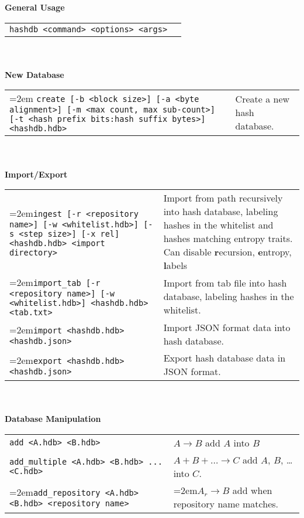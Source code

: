 \begin{footnotesize}
\textbf{General Usage} \\
\begin{tabular}{p{3.6 in} p{3.0 in}}
\texttt{hashdb <command> <options> <args>} & \\
\end{tabular}
\\
\\
\textbf{New Database} \\
\begin{tabular}{p{3.6 in} p{3.0 in}}
\hangindent=2em \texttt{create [-b <block size>] [-a <byte alignment>] [-m <max count, max sub-count>] [-t <hash prefix bits:hash suffix bytes>] <hashdb.hdb>} &
Create a new hash database.\\
\end{tabular}
\\
\\
\textbf{Import/Export} \\
\begin{tabular}{p{3.6 in} p{3.0 in}}
\hangindent=2em\texttt{ingest [-r <repository name>] [-w <whitelist.hdb>] [-s <step size>] [-x rel] <hashdb.hdb> <import directory>} &
Import from path recursively into hash database, labeling hashes in the whitelist and hashes matching entropy traits.  Can disable \textbf{r}ecursion, \textbf{e}ntropy, \textbf{l}abels \\
\hangindent=2em\texttt{import\_tab [-r <repository name>] [-w <whitelist.hdb>] <hashdb.hdb> <tab.txt>} &
Import from tab file into hash database, labeling hashes in the whitelist.\\
\hangindent=2em\texttt{import <hashdb.hdb> <hashdb.json>} &
Import JSON format data into hash database.\\
\hangindent=2em\texttt{export <hashdb.hdb> <hashdb.json>} &
Export hash database data in JSON format.\\
\end{tabular}
\\
\\
\textbf{Database Manipulation} \\
\begin{tabular}{p{3.6 in} p{3.0 in}}
\texttt{add <A.hdb> <B.hdb>} & $A \rightarrow B$ add $A$ into $B$ \\
\texttt{add\_multiple <A.hdb> <B.hdb> ... <C.hdb>} & $A + B + \ldots \rightarrow C$ add $A$, $B$, \ldots into $C$.\\
\hangindent=2em\texttt{add\_repository <A.hdb> <B.hdb> <repository name>} & \hangindent=2em$A_r \rightarrow B$ add when repository name matches.\\

\end{tabular}
\end{footnotesize}
